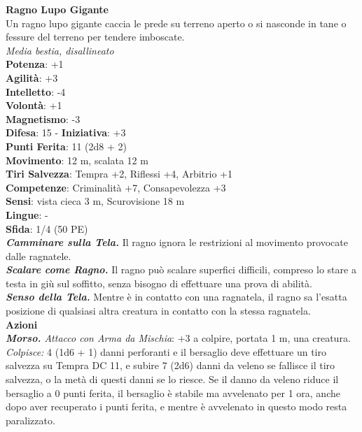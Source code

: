 \begin{multicols}{2}
\medskip\textbf{Ragno Lupo Gigante}\\
Un ragno lupo gigante caccia le prede su terreno aperto o si nasconde in tane o fessure del terreno per tendere imboscate.\\
\emph{Media bestia, disallineato}\\
\textbf{Potenza}: +1\\
\textbf{Agilità}: +3\\
\textbf{Intelletto}: -4\\
\textbf{Volontà}: +1\\
\textbf{Magnetismo}: -3\\
\textbf{Difesa}: 15 - \textbf{Iniziativa}: +3\\
\textbf{Punti Ferita}: 11 (2d8 + 2)\\
\textbf{Movimento}: 12 m, scalata 12 m\\
\textbf{Tiri Salvezza}:  Tempra +2, Riflessi +4, Arbitrio +1 \\
\textbf{Competenze}: Criminalità +7, Consapevolezza +3\\
\textbf{Sensi}: vista cieca 3 m, Scurovisione 18 m\\
\textbf{Lingue}: -\\
\textbf{Sfida}: 1/4 (50 PE)\smallskip\\
\emph{\textbf{Camminare sulla Tela.}} Il ragno ignora le restrizioni al movimento provocate dalle ragnatele.\\
\emph{\textbf{Scalare come Ragno.}} Il ragno può scalare superfici difficili, compreso lo stare a testa in giù sul soffitto, senza bisogno di effettuare una prova di abilità.\\
\emph{\textbf{Senso della Tela.}} Mentre è in contatto con una ragnatela, il ragno sa l'esatta posizione di qualsiasi altra creatura in contatto con la stessa ragnatela.\\
\smallskip\textbf{Azioni}\\
\emph{\textbf{Morso.} Attacco con Arma da Mischia}: +3 a colpire, portata 1 m, una creatura.\\
\emph{Colpisce:} 4 (1d6 + 1) danni perforanti e il bersaglio deve effettuare un tiro salvezza su Tempra DC 11, e subire 7 (2d6) danni da veleno se fallisce il tiro salvezza, o la metà di questi danni se lo riesce. Se il danno da veleno riduce il bersaglio a 0 punti ferita, il bersaglio è stabile ma avvelenato per 1 ora, anche dopo aver recuperato i punti ferita, e mentre è avvelenato in questo modo resta paralizzato.\\


\end{multicols}
